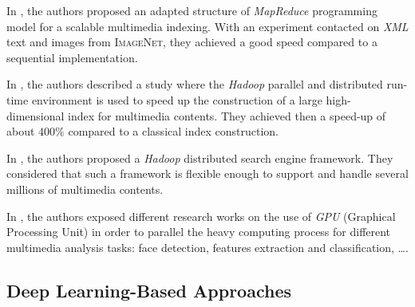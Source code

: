 		In \citep{Mohamed2012}, the authors proposed an adapted structure of \emph{MapReduce}
		programming model for a scalable multimedia indexing. With an experiment contacted on 
		\emph{XML} text and images from \textsc{ImageNet}, they achieved a good speed compared to 
		a sequential implementation.
	
		In \citep{Guhmundsson2012}, the authors described a study where the \emph{Hadoop} 
		parallel and distributed run-time environment is used to speed up the 
		construction of a large high-dimensional index
		for multimedia contents. They achieved then a speed-up of about $400 \%$ 
		compared to a classical index construction. 
		
		In \citep{Mourao2015}, the authors proposed a \emph{Hadoop} distributed search engine framework.
		They considered that such a framework is flexible enough to support and handle several millions
		of multimedia contents.

		In \citep{Chen2008,Luo2008,Lopresti2012,Oh2015,Osipyan2015}, the authors exposed different 
		research works on the use of \emph{GPU} (Graphical Processing Unit) in order to parallel
		the heavy computing process for different multimedia analysis tasks: face detection, 
		features extraction and classification, \dots{}.


		\subsection{Deep Learning-Based Approaches}
		
		
		

